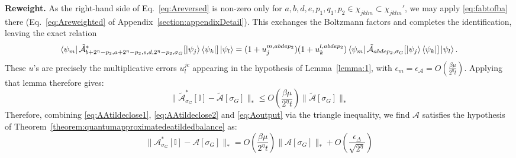 \documentclass[aps,floatfix,10pt,amssymb,amsfont,amsmath,superscriptaddress,float,nofootinbib,longbibliography,nobalancelastpage,twocolumn]{revtex4-2}
\begin{document}
\begin{widetext}
\textbf{Reweight.} As the right-hand side of Eq.~\eqref{eq:Areversed} is non-zero only for $a,b,d,e,p_1,q_1,p_2 \in \chi_{jklm} \subset \chi_{jklm}'$, we may apply \eqref{eq:fabtofba} there (Eq.~\eqref{eq:Areweighted} of Appendix~\ref{section:appendixDetail}). This exchanges the Boltzmann factors and completes the identification, leaving the exact relation
\begin{equation}
  \bra{\psi_m}\tilde{\mathcal{A}}^*_{b+2^{\eta}-p_2,a+2^{\eta}-p_2,e,d,2^{\eta}-p_2,\sigma_G}[\ket{\psi_j}\bra{\psi_k}]\ket{\psi_l} 
   =(1+u_j^{m,abdep_2})(1+u_k^{l,abdep_2})\bra{\psi_m}\tilde{\mathcal{A}}_{abdep_2,\sigma_G}[\ket{\psi_j}\bra{\psi_k}]\ket{\psi_l}.
\end{equation}
These $u$'s are precisely the multiplicative errors $u^{jc}_l$ appearing in the hypothesis of Lemma~\ref{lemma:1}, with $\epsilon_m = \epsilon_{\mathcal{A}} = O(\frac{\beta \mu}{2^{\eta}t})$. Applying that lemma therefore gives:
\begin{equation}
    \|\tilde{\mathcal{A}}^*_{\sigma_G}[\mathbb{I}] - \tilde{\mathcal{A}}[\sigma_G]\|_* \leq O\left(\frac{\beta \mu}{2^{\eta}t}\right)\|\tilde{\mathcal{A}}[\sigma_G]\|_*
    \label{eq:Aoutput}
\end{equation}
Therefore, combining \eqref{eq:AAtildeclose1}, \eqref{eq:AAtildeclose2} and \eqref{eq:Aoutput} via the triangle inequality, we find $\mathcal{A}$ satisfies the hypothesis of Theorem~\ref{theorem:quantumapproximatedeatildedbalance} as:
\begin{equation}
    \|\mathcal{A}^*_{\sigma_G}[\mathbb{I}] - \mathcal{A}[\sigma_G]\|_* = O\!\left(\frac{\beta\mu}{2^{\eta}t}\right)\|\mathcal{A}[\sigma_G]\|_* + O\!\left(\frac{\epsilon_{\Delta}}{\sqrt{2^{\eta}}}\right)
\end{equation}

\end{widetext}
\end{document}
